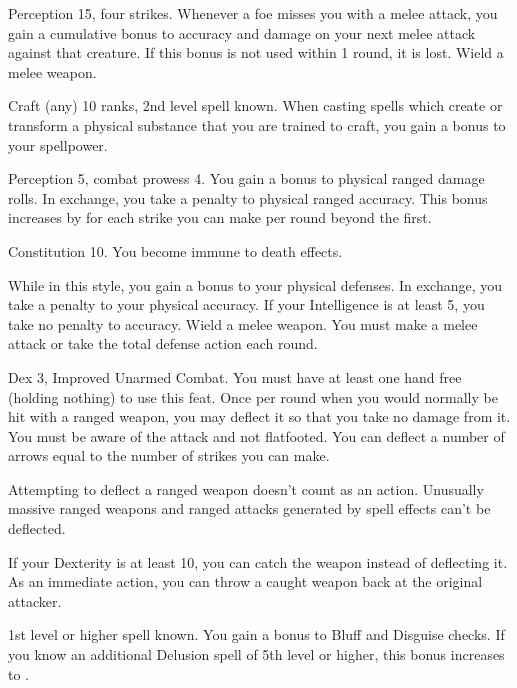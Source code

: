 \featpres Perception 15, four strikes.
\featben Whenever a foe misses you with a melee attack, you gain a cumulative  bonus to accuracy and damage on your next melee attack against that creature.
If this bonus is not used within 1 round, it is lost.
\stylereq Wield a melee weapon.

\featpres Craft (any) 10 ranks, 2nd level spell known.
\featben When casting spells which create or transform a physical substance that you are trained to craft, you gain a  bonus to your spellpower.

\featpres Perception 5, combat prowess 4.
\featben You gain a  bonus to physical ranged damage rolls.
In exchange, you take a  penalty to physical ranged accuracy.
This bonus increases by  for each strike you can make per round beyond the first.

\featpre Constitution 10.
\featben You become immune to death effects.

\featben While in this style, you gain a  bonus to your physical defenses.
In exchange, you take a  penalty to your physical accuracy.
If your Intelligence is at least 5, you take no penalty to accuracy.
\stylereq Wield a melee weapon. You must make a melee attack or take the total defense action each round.

\featpres Dex 3, Improved Unarmed Combat.
\featben You must have at least one hand free (holding nothing) to use this feat.
Once per round when you would normally be hit with a ranged weapon, you may deflect it so that you take no damage from it.
You must be aware of the attack and not flatfooted.
You can deflect a number of arrows equal to the number of strikes you can make.
\par Attempting to deflect a ranged weapon doesn't count as an action.
Unusually massive ranged weapons and ranged attacks generated by spell effects can't be deflected.
\par If your Dexterity is at least 10, you can catch the weapon instead of deflecting it.
As an immediate action, you can throw a caught weapon back at the original attacker.

\featpre 1st level or higher  spell known.
\featben You gain a  bonus to Bluff and Disguise checks.
If you know an additional Delusion spell of 5th level or higher, this bonus increases to .

